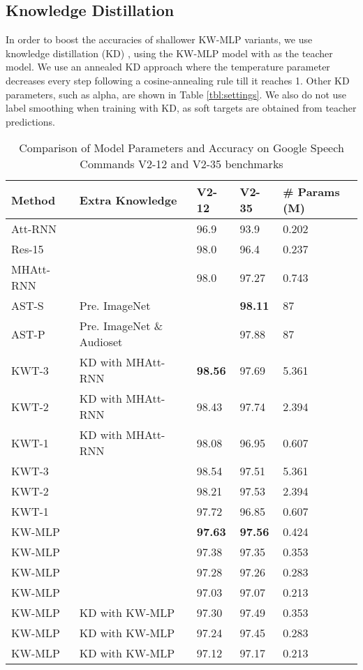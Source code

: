 \documentclass{article} \usepackage{iclr2022_conference,times}
\begin{document}
\subsection{Knowledge Distillation}
In order to boost the accuracies of shallower KW-MLP variants, we use knowledge distillation (KD) \citep{hinton2015distilling}, using the KW-MLP model with  as the teacher model. We use an annealed KD approach \citep{jafari2021annealing} where the temperature parameter decreases every step following a cosine-annealing rule till it reaches 1. Other KD parameters, such as alpha, are shown in Table \ref{tbl:settings}. We also do not use label smoothing when training with KD, as soft targets are obtained from teacher predictions.

\begin{table}[ht]
	\centering
	\caption{Comparison of Model Parameters and Accuracy on Google Speech Commands V2-12 and V2-35 benchmarks \citep{warden2018speech}}
	\label{tbl:accuracy}
	\begin{tabular}	{l  l l l l }
		\hline
		Method    & Extra Knowledge & V2-12 & V2-35 & \# Params (M) \\
		\hline
		Att-RNN \quad [\citenum{de2018neural}]   & &  96.9 & 93.9  &  0.202\\
		Res-15 \quad [\citenum{vygon2021learning}]  & & 98.0 & 96.4 & 0.237\\
		MHAtt-RNN \quad [\citenum{rybakov2020streaming}]  & & 98.0 & 97.27 & 0.743\\
		\hline
		AST-S \quad [\citenum{gong2021ast}] & Pre. ImageNet  & & \textbf{98.11} & 87\\
		AST-P  \quad [\citenum{gong2021ast}] &  Pre. ImageNet  \& Audioset & & 97.88 & 87\\
		\hline
		KWT-3  \quad [\citenum{berg21_interspeech}] & KD with MHAtt-RNN & \textbf{98.56} & 97.69 & 5.361 \\
		KWT-2   \quad [\citenum{berg21_interspeech}] & KD with MHAtt-RNN & 98.43 & 97.74 & 2.394 \\
		KWT-1  \quad [\citenum{berg21_interspeech}]  & KD with MHAtt-RNN & 98.08 & 96.95 & 0.607 \\
		\hline
		KWT-3  \quad [\citenum{berg21_interspeech}] & & 98.54 & 97.51 & 5.361 \\
		KWT-2  \quad [\citenum{berg21_interspeech}]  & & 98.21 & 97.53 & 2.394 \\
		KWT-1  \quad [\citenum{berg21_interspeech}] & & 97.72 & 96.85 & 0.607 \\
		\hline
		KW-MLP  & & \textbf{97.63} & \textbf{97.56} & 0.424 \\
		KW-MLP   & &  97.38 & 97.35 & 0.353 \\
		KW-MLP   & & 97.28 & 97.26 & 0.283 \\
		KW-MLP   & & 97.03 & 97.07 & 0.213 \\
		\hline
		KW-MLP   & KD with KW-MLP & 97.30 &  97.49     & 0.353 \\
		KW-MLP   & KD with KW-MLP & 97.24  &  97.45     & 0.283 \\
		KW-MLP  & KD with KW-MLP & 97.12 & 97.17 & 0.213 \\
	\end{tabular}
\end{table}
\end{document}
